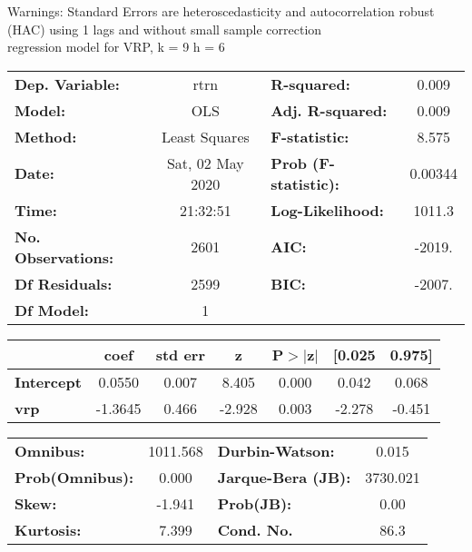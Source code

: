 Warnings: \newline
 [1] Standard Errors are heteroscedasticity and autocorrelation robust (HAC) using 1 lags and without small sample correction\\ 

regression model for VRP, k = 9 h = 6\begin{center}
\begin{tabular}{lclc}
\toprule
\textbf{Dep. Variable:}    &       rtrn       & \textbf{  R-squared:         } &     0.009   \\
\textbf{Model:}            &       OLS        & \textbf{  Adj. R-squared:    } &     0.009   \\
\textbf{Method:}           &  Least Squares   & \textbf{  F-statistic:       } &     8.575   \\
\textbf{Date:}             & Sat, 02 May 2020 & \textbf{  Prob (F-statistic):} &  0.00344    \\
\textbf{Time:}             &     21:32:51     & \textbf{  Log-Likelihood:    } &    1011.3   \\
\textbf{No. Observations:} &        2601      & \textbf{  AIC:               } &    -2019.   \\
\textbf{Df Residuals:}     &        2599      & \textbf{  BIC:               } &    -2007.   \\
\textbf{Df Model:}         &           1      & \textbf{                     } &             \\
\bottomrule
\end{tabular}
\begin{tabular}{lcccccc}
                   & \textbf{coef} & \textbf{std err} & \textbf{z} & \textbf{P$> |$z$|$} & \textbf{[0.025} & \textbf{0.975]}  \\
\midrule
\textbf{Intercept} &       0.0550  &        0.007     &     8.405  &         0.000        &        0.042    &        0.068     \\
\textbf{vrp}       &      -1.3645  &        0.466     &    -2.928  &         0.003        &       -2.278    &       -0.451     \\
\bottomrule
\end{tabular}
\begin{tabular}{lclc}
\textbf{Omnibus:}       & 1011.568 & \textbf{  Durbin-Watson:     } &    0.015  \\
\textbf{Prob(Omnibus):} &   0.000  & \textbf{  Jarque-Bera (JB):  } & 3730.021  \\
\textbf{Skew:}          &  -1.941  & \textbf{  Prob(JB):          } &     0.00  \\
\textbf{Kurtosis:}      &   7.399  & \textbf{  Cond. No.          } &     86.3  \\
\bottomrule
\end{tabular}
\end{center}

